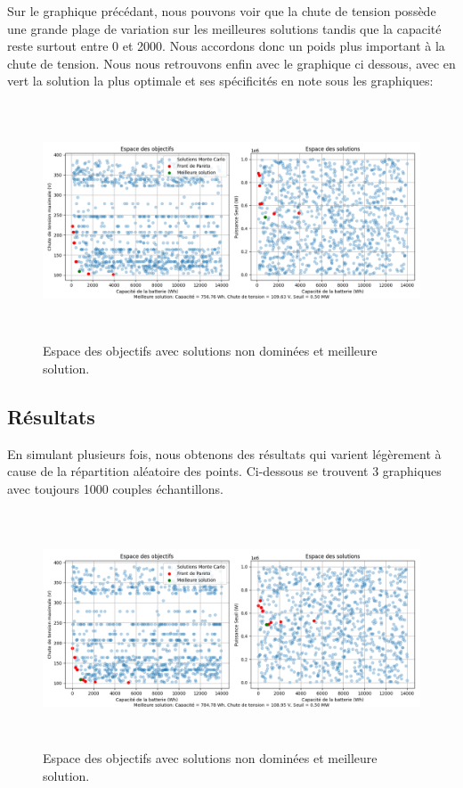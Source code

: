 \documentclass[11pt, a4paper, oneside, portrait]{report}
\begin{document}
            Sur le graphique précédant, nous pouvons voir que la chute de tension possède une grande plage de variation sur les meilleures solutions tandis que la capacité reste surtout entre 0 et 2000. Nous accordons donc un poids plus important à la chute de tension.
            Nous nous retrouvons enfin avec le graphique ci dessous, avec en vert la solution la plus optimale et ses spécificités en note sous les graphiques:

            \begin{figure}[H]
                \centering
                \includegraphics[height=7cm]{Monte-Carlo_meilleur_solution.png}
                \caption{Espace des objectifs avec solutions non dominées et meilleure solution.}
            \end{figure}

        \subsection*{Résultats}
            En simulant plusieurs fois, nous obtenons des résultats qui varient légèrement à cause de la répartition aléatoire des points. Ci-dessous se trouvent 3 graphiques avec toujours 1000 couples échantillons.

            \begin{figure}[H]
                \centering
                \includegraphics[height=7cm]{Monte-Carlo.png}
                \caption{Espace des objectifs avec solutions non dominées et meilleure solution.}
            \end{figure}
\end{document}

